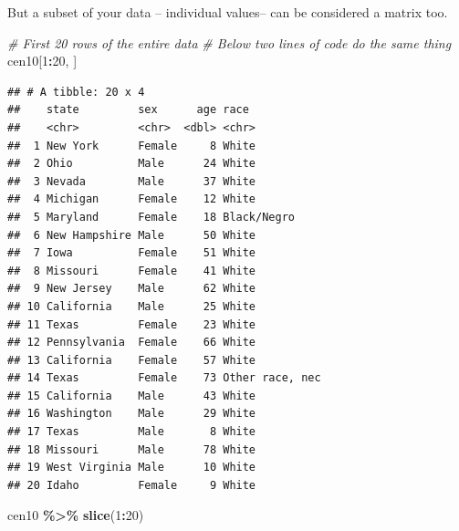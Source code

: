 \documentclass[
]{book}
\newenvironment{Shaded}{\begin{snugshade}}{\end{snugshade}}
\newcommand{\CommentTok}[1]{\textcolor[rgb]{0.56,0.35,0.01}{\textit{#1}}}
\newcommand{\DecValTok}[1]{\textcolor[rgb]{0.00,0.00,0.81}{#1}}
\newcommand{\KeywordTok}[1]{\textcolor[rgb]{0.13,0.29,0.53}{\textbf{#1}}}
\newcommand{\NormalTok}[1]{#1}
\newcommand{\OperatorTok}[1]{\textcolor[rgb]{0.81,0.36,0.00}{\textbf{#1}}}
\newcommand{\StringTok}[1]{\textcolor[rgb]{0.31,0.60,0.02}{#1}}
\theoremstyle{definition}
\theoremstyle{definition}
\theoremstyle{definition}
\theoremstyle{remark}
\begin{document}
But a subset of your data -- individual values-- can be considered a matrix too.

\begin{Shaded}
\begin{Highlighting}[]
\CommentTok{\# First 20 rows of the entire data}
\CommentTok{\# Below two lines of code do the same thing}
\NormalTok{cen10[}\DecValTok{1}\OperatorTok{:}\DecValTok{20}\NormalTok{, ]}
\end{Highlighting}
\end{Shaded}

\begin{verbatim}
## # A tibble: 20 x 4
##    state         sex      age race           
##    <chr>         <chr>  <dbl> <chr>          
##  1 New York      Female     8 White          
##  2 Ohio          Male      24 White          
##  3 Nevada        Male      37 White          
##  4 Michigan      Female    12 White          
##  5 Maryland      Female    18 Black/Negro    
##  6 New Hampshire Male      50 White          
##  7 Iowa          Female    51 White          
##  8 Missouri      Female    41 White          
##  9 New Jersey    Male      62 White          
## 10 California    Male      25 White          
## 11 Texas         Female    23 White          
## 12 Pennsylvania  Female    66 White          
## 13 California    Female    57 White          
## 14 Texas         Female    73 Other race, nec
## 15 California    Male      43 White          
## 16 Washington    Male      29 White          
## 17 Texas         Male       8 White          
## 18 Missouri      Male      78 White          
## 19 West Virginia Male      10 White          
## 20 Idaho         Female     9 White
\end{verbatim}

\begin{Shaded}
\begin{Highlighting}[]
\NormalTok{cen10 }\OperatorTok{\%>\%}\StringTok{ }\KeywordTok{slice}\NormalTok{(}\DecValTok{1}\OperatorTok{:}\DecValTok{20}\NormalTok{)}
\end{Highlighting}
\end{Shaded}
\end{document}
